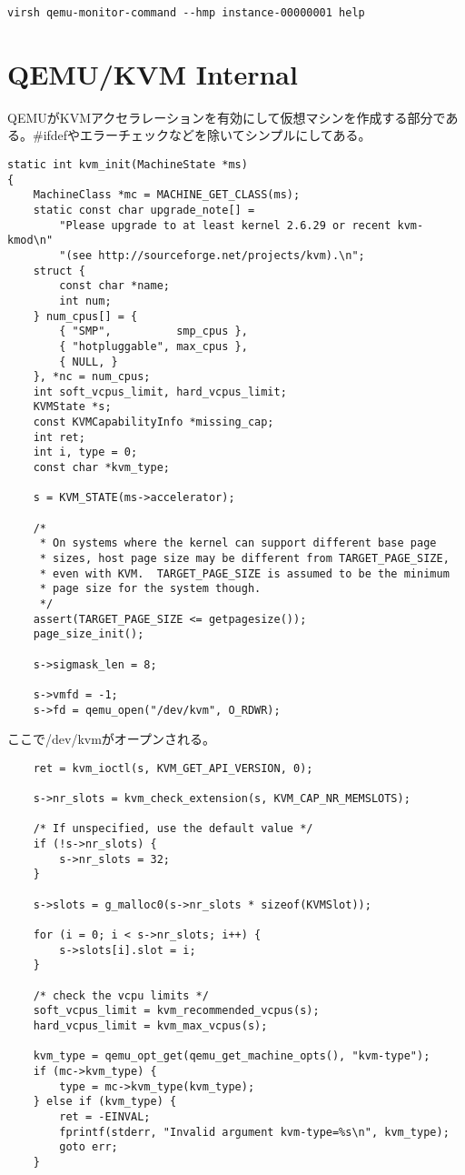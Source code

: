 \documentclass[9pt,b5paper,tombo]{jsbook}
\begin{document}
\begin{lstlisting}
virsh qemu-monitor-command --hmp instance-00000001 help
\end{lstlisting}

\section{QEMU/KVM Internal}

QEMUがKVMアクセラレーションを有効にして仮想マシンを作成する部分である。\#ifdefやエラーチェックなどを除いてシンプルにしてある。

\begin{lstlisting}
static int kvm_init(MachineState *ms)
{
    MachineClass *mc = MACHINE_GET_CLASS(ms);
    static const char upgrade_note[] =
        "Please upgrade to at least kernel 2.6.29 or recent kvm-kmod\n"
        "(see http://sourceforge.net/projects/kvm).\n";
    struct {
        const char *name;
        int num;
    } num_cpus[] = {
        { "SMP",          smp_cpus },
        { "hotpluggable", max_cpus },
        { NULL, }
    }, *nc = num_cpus;
    int soft_vcpus_limit, hard_vcpus_limit;
    KVMState *s;
    const KVMCapabilityInfo *missing_cap;
    int ret;
    int i, type = 0;
    const char *kvm_type;

    s = KVM_STATE(ms->accelerator);

    /*
     * On systems where the kernel can support different base page
     * sizes, host page size may be different from TARGET_PAGE_SIZE,
     * even with KVM.  TARGET_PAGE_SIZE is assumed to be the minimum
     * page size for the system though.
     */
    assert(TARGET_PAGE_SIZE <= getpagesize());
    page_size_init();

    s->sigmask_len = 8;

    s->vmfd = -1;
    s->fd = qemu_open("/dev/kvm", O_RDWR);
\end{lstlisting}

ここで/dev/kvmがオープンされる。

\begin{lstlisting}
    ret = kvm_ioctl(s, KVM_GET_API_VERSION, 0);

    s->nr_slots = kvm_check_extension(s, KVM_CAP_NR_MEMSLOTS);

    /* If unspecified, use the default value */
    if (!s->nr_slots) {
        s->nr_slots = 32;
    }

    s->slots = g_malloc0(s->nr_slots * sizeof(KVMSlot));

    for (i = 0; i < s->nr_slots; i++) {
        s->slots[i].slot = i;
    }

    /* check the vcpu limits */
    soft_vcpus_limit = kvm_recommended_vcpus(s);
    hard_vcpus_limit = kvm_max_vcpus(s);

    kvm_type = qemu_opt_get(qemu_get_machine_opts(), "kvm-type");
    if (mc->kvm_type) {
        type = mc->kvm_type(kvm_type);
    } else if (kvm_type) {
        ret = -EINVAL;
        fprintf(stderr, "Invalid argument kvm-type=%s\n", kvm_type);
        goto err;
    }
\end{lstlisting}
\end{document}
